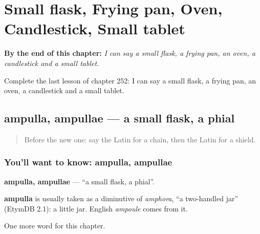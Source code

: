 
\chapter{Small flask, Frying pan, Oven, Candlestick, Small tablet}
\label{ch:la-small-flask-frying-pan-oven-candlestick-small-tablet}

\begin{chapteropening}
\textbf{By the end of this chapter:} \emph{I can say a small flask, a frying pan, an oven, a candlestick and a small tablet.}

Complete the last lesson of chapter 252: I can say a small flask, a frying pan, an oven, a candlestick and a small tablet.
\end{chapteropening}

\section[ampulla, ampullae]{ampulla, ampullae — a small flask, a phial}

\label{lesson:LA-C252-ampulla}



\begin{quote}
Before the new one: say the Latin for a chain, then the Latin for a shield.
\end{quote}

\subsection*{You'll want to know: ampulla, ampullae}
\textbf{ampulla, ampullae} — \textquotedblleft{}a small flask, a phial\textquotedblright{}.

\begin{cousinweb}
\textbf{ampulla} is usually taken as a diminutive of \emph{amphora}, \textquotedblleft{}a two-handled jar\textquotedblright{} (EtymDB 2.1): a little jar. English \emph{ampoule} comes from it.
\end{cousinweb}

\begin{grammarlens}[title={What you've built}]
One more word for this chapter.
\end{grammarlens}

